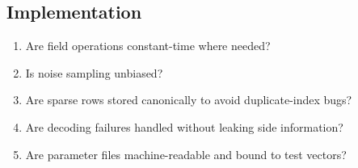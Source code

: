 \subsection{Implementation}

\begin{enumerate}
    \item Are field operations constant-time where needed?
    \item Is noise sampling unbiased?
    \item Are sparse rows stored canonically to avoid duplicate-index bugs?
    \item Are decoding failures handled without leaking side information?
    \item Are parameter files machine-readable and bound to test vectors?
\end{enumerate}
